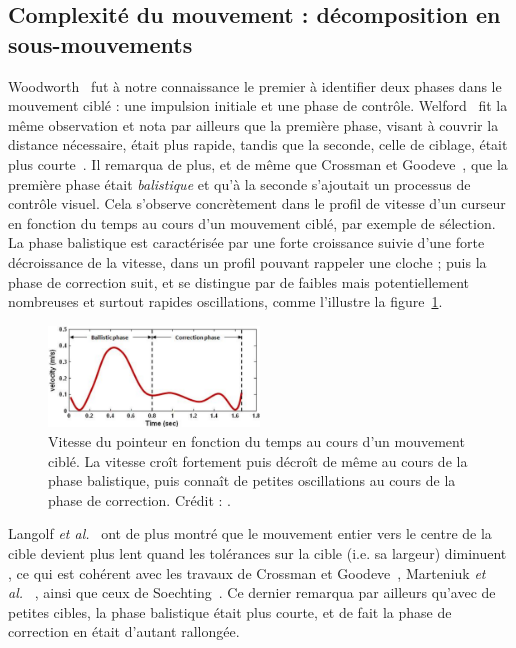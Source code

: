 	\subsection{Complexité du mouvement : décomposition en sous-mouvements}
	Woodworth~\cite{woodworth1899accuracy} fut à notre connaissance le premier à identifier deux phases dans le mouvement ciblé : une impulsion initiale et une phase de contrôle. Welford~\cite{welford1968fundamentals} fit la même observation et nota par ailleurs que la première phase, visant à couvrir la distance nécessaire, était plus rapide, tandis que la seconde, celle de ciblage, était plus courte~\cite{mackenzie1987three}. Il remarqua de plus, et de même que Crossman et Goodeve~\cite{crossman1983feedback}, que la première phase était \emph{balistique} et qu'à la seconde s'ajoutait un processus de contrôle visuel. Cela s'observe concrètement dans le profil de vitesse d'un curseur en fonction du temps au cours d'un mouvement ciblé, par exemple de sélection. La phase balistique est caractérisée par une forte croissance suivie d'une forte décroissance de la vitesse, dans un profil pouvant rappeler une cloche ; puis la phase de correction suit, et se distingue par de faibles mais potentiellement nombreuses et surtout rapides oscillations, comme l'illustre la figure~\ref{fig:ballistic}.
	
	\begin{figure}[!htbp]
		\centering
		\includegraphics[width=0.50\textwidth]{figures/ch2/ballistic}
		\caption[Profil de vitesse -- phases balistique et de correction]{Vitesse du pointeur en fonction du temps au cours d'un mouvement ciblé. La vitesse croît fortement puis décroît de même au cours de la phase balistique, puis connaît de petites oscillations au cours de la phase de correction. Crédit : \cite{liu2009designing}.}
		\label{fig:ballistic}
	\end{figure}
	
	Langolf \emph{et al.}~\cite{langolf1976investigation} ont de plus montré que \og le mouvement entier vers le centre de la cible devient plus lent quand les tolérances sur la cible (i.e. sa largeur) diminuent \fg{}, ce qui est cohérent avec les travaux de Crossman et Goodeve~\cite{crossman1983feedback}, Marteniuk \emph{et al.}~ \cite{marteniuk1987constraints}, ainsi que ceux de Soechting~\cite{soechting1984effect}. Ce dernier remarqua par ailleurs qu'avec de petites cibles, la phase balistique était plus courte, et de fait la phase de correction en était d'autant rallongée.

